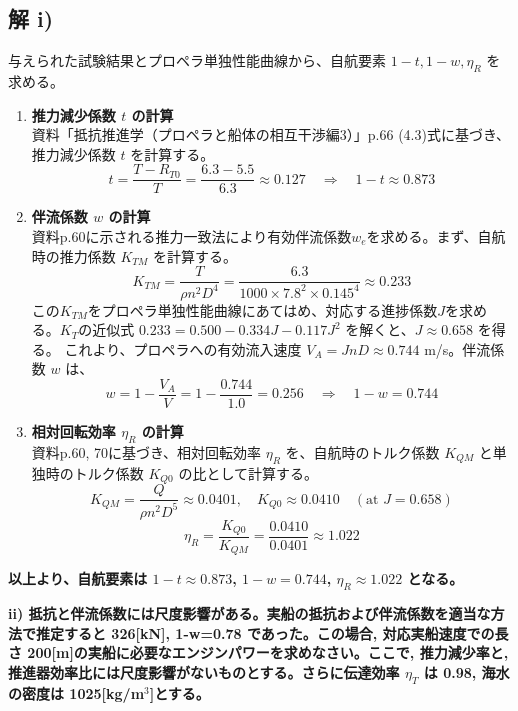 \documentclass[12pt, a4paper, leqno, dvipdfmx]{jarticle}
\begin{document}
\subsection*{解 i)}
与えられた試験結果とプロペラ単独性能曲線から、自航要素 $1-t, 1-w, \eta_R$ を求める。
\begin{enumerate}
    \item \textbf{推力減少係数 $t$ の計算}\\
    資料「抵抗推進学（プロペラと船体の相互干渉編3）」p.66 (4.3)式に基づき、推力減少係数 $t$ を計算する。
    $$ t = \frac{T - R_{T0}}{T} = \frac{6.3 - 5.5}{6.3} \approx 0.127 \quad \Rightarrow \quad 1-t \approx 0.873 $$
    \item \textbf{伴流係数 $w$ の計算}\\
    資料p.60に示される推力一致法により有効伴流係数$w_e$を求める。まず、自航時の推力係数 $K_{TM}$ を計算する。
    $$ K_{TM} = \frac{T}{\rho n^2 D^4} = \frac{6.3}{1000 \times 7.8^2 \times 0.145^4} \approx 0.233 $$
    この$K_{TM}$をプロペラ単独性能曲線にあてはめ、対応する進捗係数$J$を求める。$K_{T}$の近似式 $0.233 = 0.500 - 0.334J - 0.117J^2$ を解くと、$J \approx 0.658$ を得る。
    これより、プロペラへの有効流入速度 $V_A = J n D \approx 0.744$ m/s。伴流係数 $w$ は、
    $$ w = 1 - \frac{V_A}{V} = 1 - \frac{0.744}{1.0} = 0.256 \quad \Rightarrow \quad 1-w = 0.744 $$
    \item \textbf{相対回転効率 $\eta_R$ の計算}\\
    資料p.60, 70に基づき、相対回転効率 $\eta_R$ を、自航時のトルク係数 $K_{QM}$ と単独時のトルク係数 $K_{Q0}$ の比として計算する。
    $$ K_{QM} = \frac{Q}{\rho n^2 D^5} \approx 0.0401, \quad K_{Q0} \approx 0.0410 \quad (\text{at } J=0.658) $$
    $$ \eta_R = \frac{K_{Q0}}{K_{QM}} = \frac{0.0410}{0.0401} \approx 1.022 $$
\end{enumerate}
\textbf{以上より、自航要素は $1-t \approx 0.873$, $1-w = 0.744$, $\eta_R \approx 1.022$ となる。}

\vspace{1cm}

\textbf{ii) 抵抗と伴流係数には尺度影響がある。実船の抵抗および伴流係数を適当な方法で推定すると 326[kN], 1-w=0.78 であった。この場合, 対応実船速度での長さ 200[m]の実船に必要なエンジンパワーを求めなさい。ここで, 推力減少率と, 推進器効率比には尺度影響がないものとする。さらに伝達効率 $\eta_T$ は 0.98, 海水の密度は 1025[kg/m$^3$]とする。}

\vspace{5mm}
\end{document}
